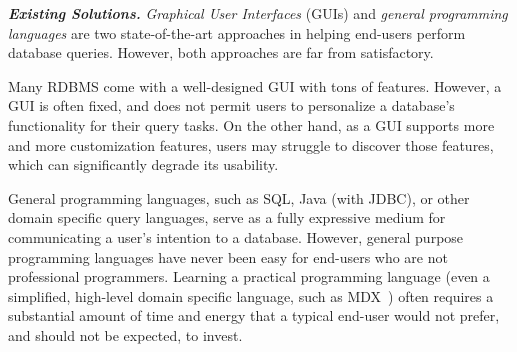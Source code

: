 









\vspace{1mm}
\noindent \textbf{\textit{Existing Solutions.}}
\textit{Graphical User Interfaces} (GUIs) and \textit{general programming languages}
are two state-of-the-art approaches in helping end-users perform
database queries. However, both approaches are far from satisfactory.

Many RDBMS come with a well-designed GUI with tons of features.
However, 
a GUI is often fixed, and does not permit users to personalize
a database's functionality for their query tasks. On the other hand,
as a GUI supports more and more customization features, users
may struggle to discover those features, which can significantly
degrade its usability. 

General programming languages, such as SQL,
Java (with JDBC), or other domain specific query languages, 
serve as a fully expressive medium  for
communicating a user's intention to a database. However, 
general purpose programming languages have never been easy for
end-users who are not professional programmers.  Learning
a practical programming language (even a simplified, high-level domain
specific language, such as MDX~\cite{mdx}) often requires a substantial amount
of time and energy that a typical end-user would not prefer,
and should not be expected, to invest. 




